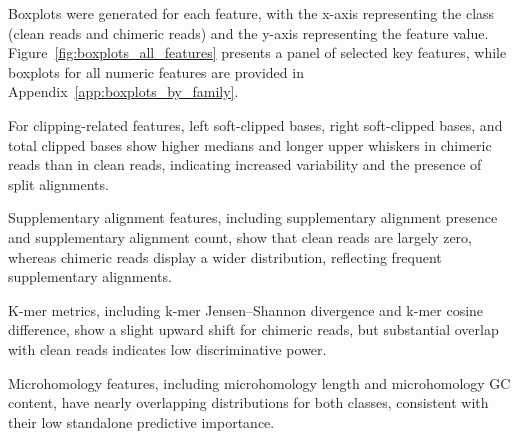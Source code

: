Boxplots were generated for each feature, with the x-axis representing the class (clean reads and chimeric reads) and the y-axis representing the feature value. Figure~\ref{fig:boxplots_all_features} presents a panel of selected key features, while boxplots for all numeric features are provided in Appendix~\ref{app:boxplots_by_family}.

For clipping-related features, left soft-clipped bases, right soft-clipped bases, and total clipped bases show higher medians and longer upper whiskers in chimeric reads than in clean reads, indicating increased variability and the presence of split alignments.

Supplementary alignment features, including supplementary alignment presence and supplementary alignment count, show that clean reads are largely zero, whereas chimeric reads display a wider distribution, reflecting frequent supplementary alignments.

K-mer metrics, including k-mer Jensen--Shannon divergence and k-mer cosine difference, show a slight upward shift for chimeric reads, but substantial overlap with clean reads indicates low discriminative power.

Microhomology features, including microhomology length and microhomology GC content, have nearly overlapping distributions for both classes, consistent with their low standalone predictive importance.

